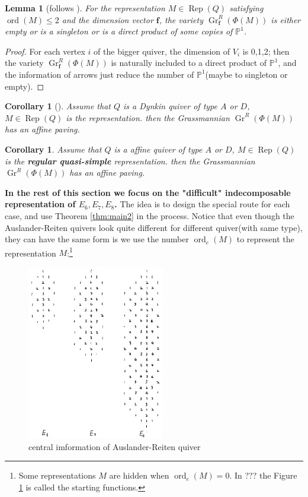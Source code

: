 \documentclass[reqno,11pt]{amsart}
\numberwithin{equation}{section}
\theoremstyle{plain}
\newtheorem{lemma}[theorem]{Lemma}
\newtheorem{corollary}[theorem]{Corollary}
\theoremstyle{plain}
\numberwithin{equation}{section}
\theoremstyle{remark}
\DeclareMathOperator{\Rep}{\operatorname{Rep}}
\newcommand{\Grr}{\operatorname{Gr}^{R}}
\newcommand{\dimvec}[1]{\mathbf{#1}}
\newcommand{\ord}{\operatorname{ord}}
\newcommand{\orde}{\operatorname{ord}_e }
\begin{document}
\begin{lemma}[{follows \cite[Lemma 2.22]{maksimau2019flag}}]
	For the representation $M \in \Rep(Q)$ satisfying $\ord(M) \leqslant 2$ and the dimension vector $\dimvec{f}$, the variety $\Grr_{\dimvec{f}}(\Phi(M))$ is either empty or is a singleton or is a direct product of some copies of $\mathbb{P}^1$.
\end{lemma}
\begin{proof}
	For each vertex $i$ of the bigger quiver, the dimension of $V_i$ is 0,1,2; then the variety $\Grr_{\dimvec{f}}(\Phi(M))$ is naturally included to a direct product of $\mathbb{P}^1$, and the information of arrows just reduce the number of $\mathbb{P}^1$(maybe to singleton or empty).
\end{proof}
\begin{corollary}[{\cite[Theorem 2.20]{maksimau2019flag}}]\label{cor:affinepavingofAD}
	Assume that $Q$ is a Dynkin quiver of type $A$ or $D$, $M \in \Rep(Q)$ is the representation. then the Grassmannian $\Grr(\Phi(M))$ has an affine paving.
\end{corollary}
\begin{corollary}\label{cor:affineADcase}
	Assume that $Q$ is a affine quiver of type $A$ or $D$, $M \in \Rep(Q)$ is the \textbf{regular quasi-simple} representation. then the Grassmannian $\Grr(\Phi(M))$ has an affine paving.
\end{corollary}

\textbf{In the rest of this section we focus on the "difficult" indecomposable representation of $E_6,E_7,E_8$.} The idea is to design the special route for each case, and use Theorem \ref{thm:main2} in the process. Notice that even though the Auslander-Reiten quivers look quite different for different quiver(with same type), they can have the same form is we use the number $\orde(M)$ to represent the representation $M$:\footnote{Some representations $M$ are hidden when $\orde(M)=0$. In ??? the Figure \ref{fig:startingfunction} is called the starting functions.}

\begin{center}
	\begin{figure}[ht]\label{fig:startingfunction}
		\vspace{0cm}
		\centering
		\includegraphics[width=6cm]{figures/startingfunction.png}
		\caption{central imformation of Auslander-Reiten quiver}
	\end{figure}
\end{center}
\end{document}
